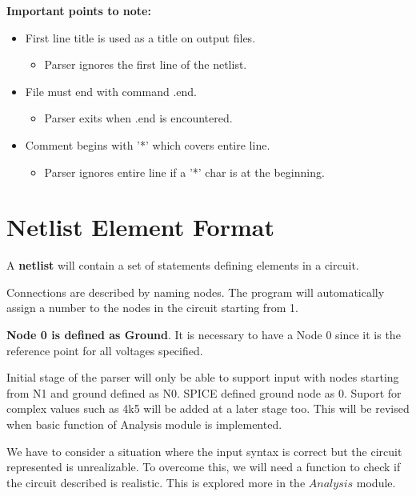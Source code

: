 \documentclass[a4paper, titlepage]{article}
\begin{document}
    \textbf{Important points to note:}
    \begin{itemize}
        \item First line {\selectfont title } is used as a title on output files.
        \begin{itemize}
            \item Parser ignores the first line of the netlist.
        \end{itemize}
        \item File must end with command {\selectfont .end}.
        \begin{itemize}
            \item Parser exits when {\selectfont .end} is encountered.
        \end{itemize}
        \item Comment begins with '*' which covers entire line.
        \begin{itemize}
            \item Parser ignores entire line if a '*' char is at the beginning.
        \end{itemize}
    \end{itemize}
    \pagebreak
    \section{Netlist Element Format}
    A \textbf{netlist} will contain a set of statements defining elements in a circuit.
    \par
    Connections are described by naming nodes. The program will automatically assign a number to the nodes in the circuit
    starting from 1. 
    \par
    \textbf{Node 0 is defined as Ground}. It is necessary to have a Node 0 since it is the reference point for 
    all voltages specified.
    \par
    Initial stage of the parser will only be able to support input with nodes starting from N1 and ground defined as N0.
    SPICE defined ground node as $0$. Suport for complex values such as 4k5 will be added at a later stage too.
    This will be revised when basic function of Analysis module is implemented.
    \par
    We have to consider a situation where the input syntax is correct but the circuit represented is unrealizable.
    To overcome this, we will need a function to check if the circuit described is realistic. This is explored more
    in the $Analysis$ module.
\end{document}
